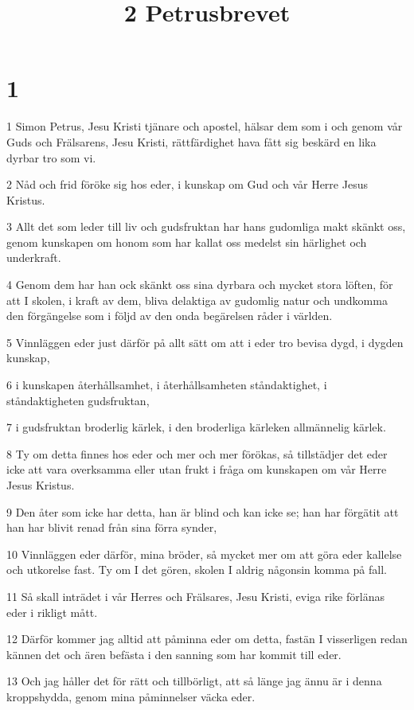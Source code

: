 

\title{2 Petrusbrevet}


\chapter{1}

\par 1 Simon Petrus, Jesu Kristi tjänare och apostel, hälsar dem som i och genom vår Guds och Frälsarens, Jesu Kristi, rättfärdighet hava fått sig beskärd en lika dyrbar tro som vi.
\par 2 Nåd och frid föröke sig hos eder, i kunskap om Gud och vår Herre Jesus Kristus.
\par 3 Allt det som leder till liv och gudsfruktan har hans gudomliga makt skänkt oss, genom kunskapen om honom som har kallat oss medelst sin härlighet och underkraft.
\par 4 Genom dem har han ock skänkt oss sina dyrbara och mycket stora löften, för att I skolen, i kraft av dem, bliva delaktiga av gudomlig natur och undkomma den förgängelse som i följd av den onda begärelsen råder i världen.
\par 5 Vinnläggen eder just därför på allt sätt om att i eder tro bevisa dygd, i dygden kunskap,
\par 6 i kunskapen återhållsamhet, i återhållsamheten ståndaktighet, i ståndaktigheten gudsfruktan,
\par 7 i gudsfruktan broderlig kärlek, i den broderliga kärleken allmännelig kärlek.
\par 8 Ty om detta finnes hos eder och mer och mer förökas, så tillstädjer det eder icke att vara overksamma eller utan frukt i fråga om kunskapen om vår Herre Jesus Kristus.
\par 9 Den åter som icke har detta, han är blind och kan icke se; han har förgätit att han har blivit renad från sina förra synder,
\par 10 Vinnläggen eder därför, mina bröder, så mycket mer om att göra eder kallelse och utkorelse fast. Ty om I det gören, skolen I aldrig någonsin komma på fall.
\par 11 Så skall inträdet i vår Herres och Frälsares, Jesu Kristi, eviga rike förlänas eder i rikligt mått.
\par 12 Därför kommer jag alltid att påminna eder om detta, fastän I visserligen redan kännen det och ären befästa i den sanning som har kommit till eder.
\par 13 Och jag håller det för rätt och tillbörligt, att så länge jag ännu är i denna kroppshydda, genom mina påminnelser väcka eder.
